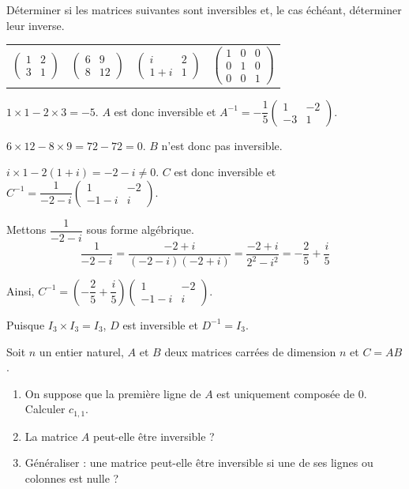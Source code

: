 \documentclass[11pt,fleqn]{book} %
\begin{document}
\begin{exercise}[topic=mat03]Déterminer si les matrices suivantes sont inversibles et, le cas échéant, déterminer leur inverse.

\begin{tabularx}{\linewidth}{XXXX}
$\begin{pmatrix}1 & 2 \\ 3 & 1\end{pmatrix}$ & $\begin{pmatrix}6 & 9 \\ 8 & 12\end{pmatrix}$ & $\begin{pmatrix}i & 2 \\ 1+i & 1\end{pmatrix}$ & $\begin{pmatrix}1 & 0 & 0 \\ 0 & 1 & 0 \\ 0 & 0 & 1\end{pmatrix}$\end{tabularx}\end{exercise}

\begin{solution}\(1\times 1 - 2 \times 3 = -5\). \(A\) est donc inversible et \(A^{-1}=-\dfrac{1}{5} \begin{pmatrix} 1&-2\\-3&1\end{pmatrix}\).

\(6\times 12 - 8 \times 9 = 72-72 = 0\). \(B\) n'est donc pas inversible.

\(i \times 1 - 2(1+i) = -2-i \neq 0\). \(C\) est donc inversible et \(C^{-1}=\dfrac{1}{-2-i}\begin{pmatrix}1 & -2 \\ -1-i & i\end{pmatrix}\).

 Mettons \(\dfrac{1}{-2-i}\) sous forme algébrique.
\[ \dfrac{1}{-2-i}=\dfrac{-2+i}{(-2-i)(-2+i)}=\dfrac{-2+i}{2^2-i^2}=-\dfrac{2}{5}+\dfrac{i}{5}\]

Ainsi, \(C^{-1} = \left(-\dfrac{2}{5}+\dfrac{i}{5}\right)\begin{pmatrix}1 & -2 \\ -1-i & i\end{pmatrix}\).

Puisque \(I_3 \times I_3 = I_3\), \(D\) est inversible et \(D^{-1}=I_3\).\end{solution}


\begin{exercise}[topic=mat03]Soit $n$ un entier naturel, $A$ et $B$ deux matrices carrées de dimension $n$ et $C=AB$.
\begin{enumerate}
\item On suppose que la première ligne de $A$ est uniquement composée de 0. Calculer $c_{1,1}$.
\item La matrice $A$ peut-elle être inversible ?
\item Généraliser : une matrice peut-elle être inversible si une de ses lignes ou colonnes est nulle ?
\end{enumerate}\end{exercise}
\end{document}
